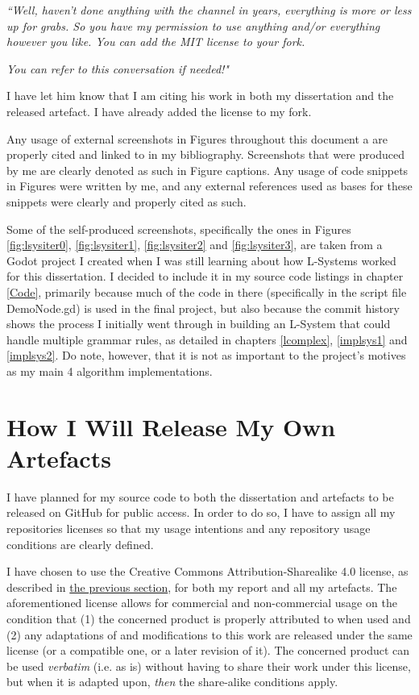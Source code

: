 \textit{``Well, haven't done anything with the channel in years, everything is more or less up for grabs. So you have my permission to use anything and/or everything however you like. You can add the MIT license to your fork.}

\textit{You can refer to this conversation if needed!"}

I have let him know that I am citing his work in both my dissertation and the released artefact. I have already added the license to my fork.\cite{codatGD4LSystemGH}

Any usage of external screenshots in Figures throughout this document a are properly cited and linked to in my bibliography. Screenshots that were produced by me are clearly denoted as such in Figure captions. Any usage of code snippets in Figures were written by me, and any external references used as bases for these snippets were clearly and properly cited as such.

Some of the self-produced screenshots, specifically the ones in Figures \ref{fig:lsysiter0}, \ref{fig:lsysiter1}, \ref{fig:lsysiter2} and \ref{fig:lsysiter3}, are taken from a Godot project I created when I was still learning about how L-Systems worked for this dissertation. I decided to include it in my source code listings in chapter \ref{Code}, primarily because much of the code in there (specifically in the script file DemoNode.gd) is used in the final project, but also because the commit history shows the process I initially went through in building an L-System that could handle multiple grammar rules, as detailed in chapters \ref{lcomplex}, \ref{implsys1} and \ref{implsys2}. Do note, however, that it is not as important to the project's motives as my main 4 algorithm implementations. 

\section{How I Will Release My Own Artefacts} \label{howrelease}

I have planned for my source code to both the dissertation and artefacts to be released on GitHub for public access. In order to do so, I have to assign all my repositories licenses so that my usage intentions and any repository usage conditions are clearly defined. 

I have chosen to use the Creative Commons Attribution-Sharealike 4.0 license, as described in \hyperref[howuse]{the previous section}, for both my report and all my artefacts. The aforementioned license allows for commercial and non-commercial usage on the condition that (1) the concerned product is properly attributed to when used and (2) any adaptations of and modifications to this work are released under the same license (or a compatible one, or a later revision of it).\cite{cc_at_sa_4} The concerned product can be used \textit{verbatim} (i.e. as is) without having to share their work under this license, but when it is adapted upon, \textit{then} the share-alike conditions apply.

